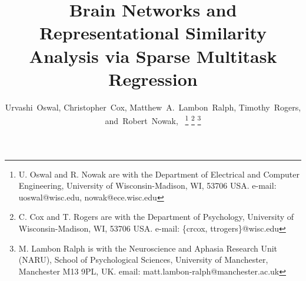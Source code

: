 \documentclass[journal]{IEEEtran}
\begin{document}
	\title{Brain Networks and Representational Similarity Analysis via Sparse Multitask Regression}
	
	
	\author{Urvashi~Oswal,
		Christopher~Cox,
		Matthew~A.~Lambon~Ralph,
		Timothy~Rogers,
		and~Robert~Nowak,~%
	\thanks{U. Oswal and R. Nowak are with the Department of Electrical and Computer Engineering, University of Wisconsin-Madison, WI, 53706 USA. e-mail: uoswal@wisc.edu, nowak@ece.wisc.edu}%
	\thanks{C. Cox and T. Rogers are with the Department of Psychology, University of Wisconsin-Madison, WI, 53706 USA. e-mail: \{crcox, ttrogers\}@wisc.edu}%
	\thanks{M. Lambon Ralph is with the Neuroscience and Aphasia Research Unit (NARU), School of Psychological Sciences, University of Manchester, Manchester M13 9PL, UK. email: matt.lambon-ralph@manchester.ac.uk}}%
	
	
	
	
	
	
	
	
	
	
	
	
	
	\maketitle
	
	\begin{abstract}
		
	\end{abstract}
	
\end{document}
